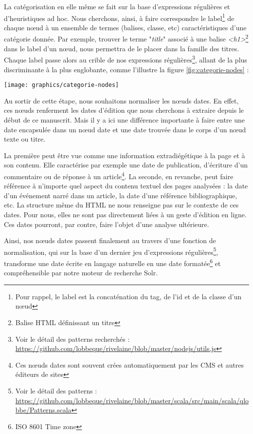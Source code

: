 \documentclass[symmetric,justified,marginals=raggedouter]{tufte-book}
\begin{document}
\noindent La catégorisation en elle même se fait sur la base d'expressions régulières et d'heuristiques ad hoc. Nous cherchons, ainsi, à faire correspondre le label\footnote{Pour rappel, le label est la concaténation du tag, de l'id et de la classe d'un nœud } de chaque nœud à un ensemble de termes (balises, classe, etc) caractéristiques d'une catégorie donnée. Par exemple, trouver le terme "\textit{title}" associé à une balise \textit{<h1>}\footnote{Balise HTML définissant un titre} dans le label d'un nœud, nous permettra de le placer dans la famille des titres. Chaque label passe alors au crible de nos expressions régulières\footnote{Voir le détail des patterns recherchés : \url{https://github.com/lobbeque/rivelaine/blob/master/nodejs/utils.js}}, allant de la plus discriminante à la plus englobante, comme l'illustre la figure \ref{fig:categorie-nodes} : 

\begin{figure*}%
  \texttt{[image: graphics/categorie-nodes]}
  \caption{Chaine d'expressions régulières permettant la catégorisation d'un nœud HTML sur la base de son label}
  \label{fig:categorie-nodes}
\end{figure*}

\noindent Au sortir de cette étape, nous souhaitons normaliser les nœuds dates. En effet, ces nœuds renferment les dates d'édition que nous cherchons à extraire depuis le début de ce manuscrit. Mais il y a ici une différence importante à faire entre une date encapsulée dans un nœud date et une date trouvée dans le corps d'un nœud texte ou titre. 

La première peut être vue comme une information extradiégétique à la page et à son contenu. Elle caractérise par exemple une date de publication, d'écriture d'un commentaire ou de réponse à un article\footnote{Ces nœuds dates sont souvent crées automatiquement par les CMS et autres éditeurs de sites}. La seconde, en revanche, peut faire référence à n'importe quel aspect du contenu textuel des pages analysées : la date d'un événement narré dans un article, la date d'une référence bibliographique, etc. La structure même du HTML ne nous renseigne pas sur le contexte de ces dates. Pour nous, elles ne sont pas directement liées à un geste d'édition en ligne. Ces dates pourront, par contre, faire l'objet d'une analyse ultérieure.

Ainsi, nos nœuds dates passent finalement au travers d'une fonction de normalisation, qui sur la base d'un dernier jeu d'expressions régulières\footnote{Voir le détail des patterns : \url{https://github.com/lobbeque/rivelaine/blob/master/scala/src/main/scala/qlobbe/Patterns.scala}}, transforme une date écrite en langage naturelle en une date formatée\footnote{ISO 8601 Time zone} et compréhensible par notre moteur de recherche Solr.
\end{document}
